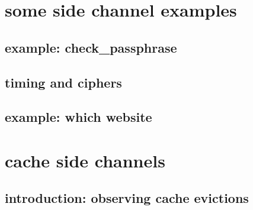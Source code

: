 \date{}
\title{}
\date{}
\usepackage{algorithmic}

\begin{frame}
    \titlepage
\end{frame}




\section{some side channel examples}

\subsection{example: check\_passphrase}



\subsection{timing and ciphers}



\subsection{example: which website}






\section{cache side channels}

\subsection{introduction: observing cache evictions}

